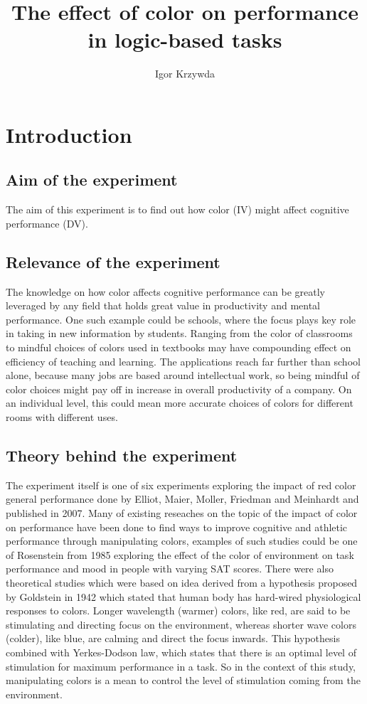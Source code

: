 \documentclass[12pt, a4]{article}
\title{The effect of color on performance in logic-based tasks}
\author{Igor Krzywda}
\begin{document}
\maketitle

\section*{Introduction}

\subsection*{Aim of the experiment}
The aim of this experiment is to find out how color (IV) might affect cognitive performance (DV).  

\subsection*{Relevance of the experiment}
The knowledge on how color affects cognitive performance can be greatly leveraged by any field that holds great value in productivity and mental performance. 
One such example could be schools, where the focus plays key role in taking in new information by students. Ranging from the color of classrooms to mindful choices of
colors used in textbooks may have compounding effect on efficiency of teaching and learning. The applications reach far further than school alone, because many jobs 
are based around intellectual work, so being mindful of color choices might pay off in increase in overall productivity of a company. On an individual level, this 
could mean more accurate choices of colors for different rooms with different uses.

\subsection*{Theory behind the experiment}
The experiment itself is one of six experiments exploring the impact of red color general performance done by Elliot, Maier, Moller, Friedman and Meinhardt and published in 
2007. Many of existing reseaches on the topic of the impact of color on performance have been done to find ways to improve cognitive and athletic performance through manipulating
colors, examples of such studies could be one of Rosenstein from 1985 exploring the effect of the color of environment on task performance and mood in people with varying SAT 
scores. There were also theoretical studies which were based on idea derived from a hypothesis proposed by Goldstein in 1942 which stated that human body has hard-wired 
physiological responses to colors. Longer wavelength (warmer) colors, like red, are said to be stimulating and directing focus on the environment, whereas shorter wave colors
(colder), like blue, are calming and direct the focus inwards. This hypothesis combined with Yerkes-Dodson law, which states that there is an optimal level of stimulation for 
maximum performance in a task. So in the context of this study, manipulating colors is a mean to control the level of stimulation coming from the environment.
\end{document}
